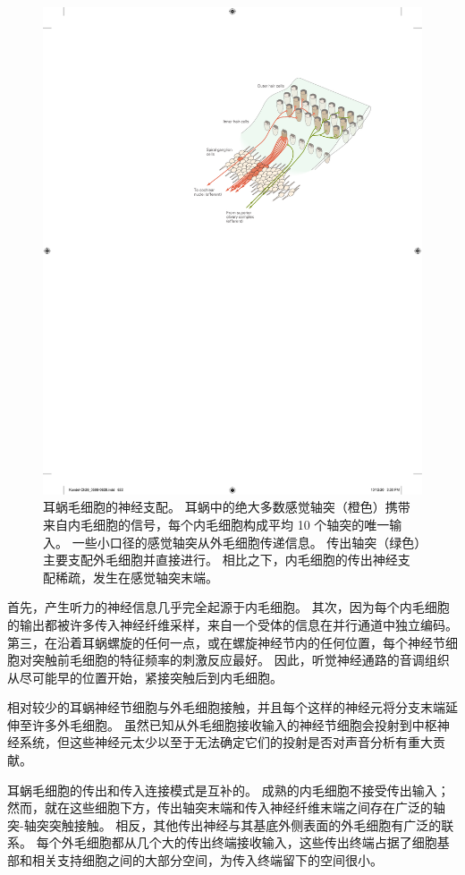 \begin{figure}[htbp]
	\centering
	\includegraphics[width=0.65\linewidth]{chap26/fig_26_17}
	\caption{耳蜗毛细胞的神经支配。
		耳蜗中的绝大多数感觉轴突（橙色）携带来自内毛细胞的信号，每个内毛细胞构成平均 10 个轴突的唯一输入。
		一些小口径的感觉轴突从外毛细胞传递信息。
		传出轴突（绿色）主要支配外毛细胞并直接进行。
		相比之下，内毛细胞的传出神经支配稀疏，发生在感觉轴突末端\cite{spoendlin1974neuroanatomy}。}
	\label{fig:26_17}
\end{figure}


首先，产生听力的神经信息几乎完全起源于内毛细胞。
其次，因为每个内毛细胞的输出都被许多传入神经纤维采样，来自一个受体的信息在并行通道中独立编码。
第三，在沿着耳蜗螺旋的任何一点，或在螺旋神经节内的任何位置，每个神经节细胞对突触前毛细胞的特征频率的刺激反应最好。
因此，听觉神经通路的音调组织从尽可能早的位置开始，紧接突触后到内毛细胞。


相对较少的耳蜗神经节细胞与外毛细胞接触，并且每个这样的神经元将分支末端延伸至许多外毛细胞。
虽然已知从外毛细胞接收输入的神经节细胞会投射到中枢神经系统，但这些神经元太少以至于无法确定它们的投射是否对声音分析有重大贡献。


耳蜗毛细胞的传出和传入连接模式是互补的。
成熟的内毛细胞不接受传出输入；
然而，就在这些细胞下方，传出轴突末端和传入神经纤维末端之间存在广泛的轴突-轴突突触接触。
相反，其他传出神经与其基底外侧表面的外毛细胞有广泛的联系。
每个外毛细胞都从几个大的传出终端接收输入，这些传出终端占据了细胞基部和相关支持细胞之间的大部分空间，为传入终端留下的空间很小。



